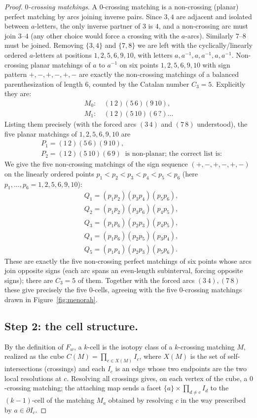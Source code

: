 \begin{proof}
\emph{$0$-crossing matchings.} A $0$-crossing matching is a non-crossing
(planar) perfect matching by arcs joining inverse pairs. Since $3,4$ are
adjacent and isolated between $a$-letters, the only inverse partner of $3$
is $4$, and a non-crossing arc must join $3$–$4$ (any other choice would force
a crossing with the $a$-arcs). Similarly $7$–$8$ must be joined. Removing
$\{3,4\}$ and $\{7,8\}$ we are left with the cyclically/linearly ordered
$a$-letters at positions $1,2,5,6,9,10$, with letters $a,a^{-1},a,a^{-1},a,a^{-1}$.
Non-crossing planar matchings of $a$ to $a^{-1}$ on six points
$1,2,5,6,9,10$ with sign pattern $+,-,+,-,+,-$ are exactly the non-crossing
matchings of a balanced parenthesization of length $6$, counted by the
Catalan number $C_3=5$. Explicitly they are:
\[
\begin{aligned}
M_0:&\ (1\,2)(5\,6)(9\,10),\\
M_1:&\ (1\,2)(5\,10)(6\,?)\dots
\end{aligned}
\]
Listing them precisely (with the forced arcs $(3\,4)$ and $(7\,8)$ understood),
the five planar matchings of $1,2,5,6,9,10$ are
\[
\begin{aligned}
&P_1=(1\,2)(5\,6)(9\,10),\\
&P_2=(1\,2)(5\,10)(6\,9)\ \text{ is non-planar; the correct list is:}
\end{aligned}
\]
We give the five non-crossing matchings of the sign sequence
$(+,-,+,-,+,-)$ on the linearly ordered points $p_1<p_2<p_3<p_4<p_5<p_6$
(here $p_1,\dots,p_6=1,2,5,6,9,10$):
\[
\begin{aligned}
&Q_1=(p_1p_2)(p_3p_4)(p_5p_6),\\
&Q_2=(p_1p_2)(p_3p_6)(p_4p_5),\\
&Q_3=(p_1p_6)(p_2p_3)(p_4p_5),\\
&Q_4=(p_1p_6)(p_2p_5)(p_3p_4),\\
&Q_5=(p_1p_4)(p_2p_3)(p_5p_6).
\end{aligned}
\]
These are exactly the five non-crossing perfect matchings of six points whose
arcs join opposite signs (each arc spans an even-length subinterval, forcing
opposite signs); there are $C_3=5$ of them. Together with the forced arcs
$(3\,4),(7\,8)$ these give precisely the five $0$-cells, agreeing with the
five $0$-crossing matchings drawn in Figure~\ref{fig:menorah}.

\subsection*{Step 2: the cell structure.}
By the definition of $F_w$, a $k$-cell is the isotopy class of a $k$-crossing
matching $M$, realized as the cube $C(M)=\prod_{c\in X(M)}I_c$, where $X(M)$
is the set of self-intersections (crossings) and each $I_c$ is an edge whose
two endpoints are the two local resolutions at $c$. Resolving all crossings
gives, on each vertex of the cube, a $0$-crossing matching; the attaching map
sends a facet $\{a\}\times\prod_{d\neq c}I_d$ to the $(k-1)$-cell of the
matching $M_a$ obtained by resolving $c$ in the way prescribed by
$a\in\partial I_c$.


\end{proof}
